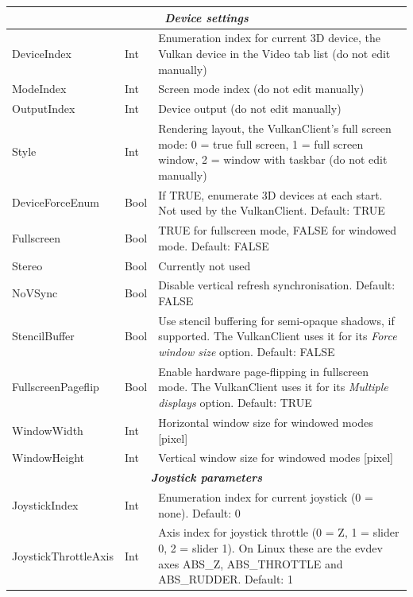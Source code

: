 \documentclass[Orbiter User Manual.tex]{subfiles}
\begin{document}
\begin{longtable}{ |p{}|p{}|p{}| }
	\hline
	\multicolumn{3}{|c|}{\rule{0pt}{2ex}\textbf{\textit{Device settings}}}\\
	\hline\rule{0pt}{2ex}
	DeviceIndex & Int & Enumeration index for current 3D device, the Vulkan device in the Video tab list (do not edit manually)\\
	\hline\rule{0pt}{2ex}
	ModeIndex & Int & Screen mode index (do not edit manually)\\
	\hline\rule{0pt}{2ex}
	OutputIndex & Int & Device output (do not edit manually)\\
	\hline\rule{0pt}{2ex}
	Style & Int & Rendering layout, the VulkanClient's full screen mode: 0 = true full screen, 1 = full screen window, 2 = window with taskbar (do not edit manually)\\
	\hline\rule{0pt}{2ex}
	DeviceForceEnum & Bool & If TRUE, enumerate 3D devices at each start. Not used by the VulkanClient. Default: TRUE\\
	\hline\rule{0pt}{2ex}
	Fullscreen & Bool & TRUE for fullscreen mode, FALSE for windowed mode. Default: FALSE\\
	\hline\rule{0pt}{2ex}
	Stereo & Bool & Currently not used\\
	\hline\rule{0pt}{2ex}
	NoVSync & Bool & Disable vertical refresh synchronisation. Default: FALSE\\
	\hline\rule{0pt}{2ex}
	StencilBuffer & Bool & Use stencil buffering for semi-opaque shadows, if supported. The VulkanClient uses it for its \textit{Force window size} option. Default: FALSE\\
	\hline\rule{0pt}{2ex}
	FullscreenPageflip & Bool & Enable hardware page-flipping in fullscreen mode. The VulkanClient uses it for its \textit{Multiple displays} option. Default: TRUE\\
	\hline\rule{0pt}{2ex}
	WindowWidth & Int & Horizontal window size for windowed modes [pixel]\\
	\hline\rule{0pt}{2ex}
	WindowHeight & Int & Vertical window size for windowed modes [pixel]\\
	\hline
	\multicolumn{3}{|c|}{\rule{0pt}{2ex}\textbf{\textit{Joystick parameters}}}\\
	\hline\rule{0pt}{2ex}
	JoystickIndex & Int & Enumeration index for current joystick (0 = none). Default: 0\\
	\hline\rule{0pt}{2ex}
	JoystickThrottleAxis & Int & Axis index for joystick throttle (0 = Z, 1 = slider 0, 2 = slider 1). On Linux these are the evdev axes ABS\_Z, ABS\_THROTTLE and ABS\_RUDDER. Default: 1\\

\end{longtable}
\end{document}
